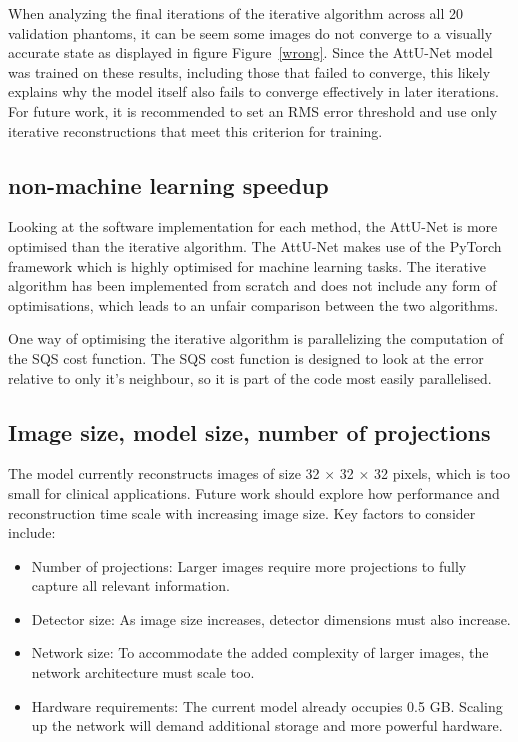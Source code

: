 \documentclass{article}
\begin{document}
When analyzing the final iterations of the iterative algorithm across all 20 validation phantoms, it can be seem some images do not converge to a visually accurate state as displayed in figure Figure~\ref{wrong}. Since the AttU-Net model was trained on these results, including those that failed to converge, this likely explains why the model itself also fails to converge effectively in later iterations. For future work, it is recommended to set an RMS error threshold and use only iterative reconstructions that meet this criterion for training.

\subsection{non-machine learning speedup}

Looking at the software implementation for each method, the AttU-Net is more optimised than the iterative algorithm. The AttU-Net makes use of the PyTorch framework which is highly optimised for machine learning tasks. The iterative algorithm has been implemented from scratch and does not include any form of optimisations, which leads to an unfair comparison between the two algorithms.

One way of optimising the iterative algorithm is parallelizing the computation of the SQS cost function. The SQS cost function is designed to look at the error relative to only it's neighbour, so it is part of the code most easily parallelised.

\subsection{Image size, model size, number of projections}

The model currently reconstructs images of size 32 $\times$ 32 $\times$ 32 pixels, which is too small for clinical applications. Future work should explore how performance and reconstruction time scale with increasing image size. Key factors to consider include:

\begin{itemize}
\item Number of projections: Larger images require more projections to fully capture all relevant information.
\item Detector size: As image size increases, detector dimensions must also increase.
\item Network size: To accommodate the added complexity of larger images, the network architecture must scale too.
\item Hardware requirements: The current model already occupies 0.5 GB. Scaling up the network will demand additional storage and more powerful hardware.
\end{itemize}
\end{document}
